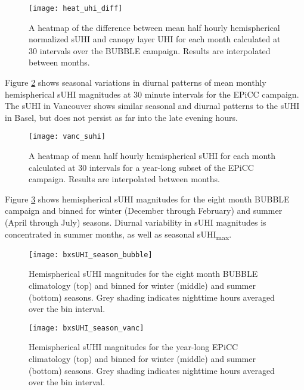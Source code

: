 \begin{bibunit}
\begin{figure}[H]
	\centering
	\texttt{[image: heat\_uhi\_diff]}
	\caption{A heatmap of the difference between mean half hourly hemispherical normalized sUHI and canopy layer UHI for each month calculated at 30 \si{\min} intervals over the BUBBLE campaign. Results are interpolated between months.}
	\label{heat_uhi_diff}
\end{figure}

Figure \ref{vanc_suhi} shows seasonal variations in diurnal patterns of mean monthly hemispherical sUHI magnitudes at 30 minute intervals for the EPiCC campaign. The sUHI in Vancouver shows similar seasonal and diurnal patterns to the sUHI in Basel, but does not persist as far into the late evening hours.

\begin{figure}[H]
	\centering
	\texttt{[image: vanc\_suhi]}
	\caption{A heatmap of mean half hourly hemispherical sUHI for each month calculated at 30 \si{\min} intervals for a year-long subset of the EPiCC campaign. Results are interpolated between months.}
	\label{vanc_suhi}
\end{figure}

Figure \ref{bxsUHI_season_bubble} shows hemispherical sUHI magnitudes for the eight month BUBBLE campaign and binned for winter (December through February) and summer (April through July) seasons. Diurnal variability in sUHI magnitudes is concentrated in summer months, as well as seasonal sUHI\textsubscript{max}. 

\begin{figure}[H]
	\centering
	\texttt{[image: bxsUHI\_season\_bubble]}
	\caption{Hemispherical sUHI magnitudes for the eight month BUBBLE climatology (top) and binned for winter (middle) and summer (bottom) seasons. Grey shading indicates nighttime hours averaged over the bin interval.}
	\label{bxsUHI_season_bubble}
\end{figure}

\begin{figure}[H]
	\centering
	\texttt{[image: bxsUHI\_season\_vanc]}
	\caption{Hemispherical sUHI magnitudes for the year-long EPiCC climatology (top) and binned for winter (middle) and summer (bottom) seasons. Grey shading indicates nighttime hours averaged over the bin interval.}
	\label{bxsUHI_season_vanc}
\end{figure}


\end{bibunit}
